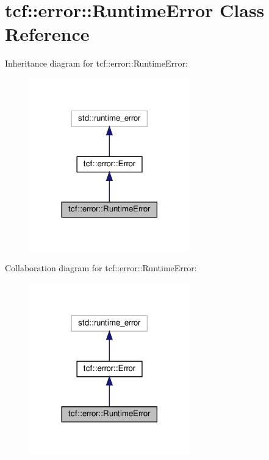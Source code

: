 \hypertarget{classtcf_1_1error_1_1RuntimeError}{}\section{tcf\+:\+:error\+:\+:Runtime\+Error Class Reference}
\label{classtcf_1_1error_1_1RuntimeError}


Inheritance diagram for tcf\+:\+:error\+:\+:Runtime\+Error\+:
\nopagebreak
\begin{figure}[H]
\begin{center}
\leavevmode
\includegraphics[width=197pt]{classtcf_1_1error_1_1RuntimeError__inherit__graph}
\end{center}
\end{figure}


Collaboration diagram for tcf\+:\+:error\+:\+:Runtime\+Error\+:
\nopagebreak
\begin{figure}[H]
\begin{center}
\leavevmode
\includegraphics[width=197pt]{classtcf_1_1error_1_1RuntimeError__coll__graph}
\end{center}
\end{figure}
